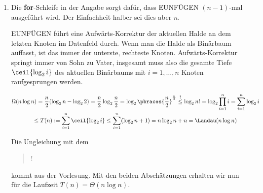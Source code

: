 \begin{solution}
\begin{enumerate}[label = \alph*]
\begin{center}

    \end{center}

    \item Die \textbf{for}-Schleife in der Angabe sorgt dafür, dass EUNFÜGEN $(n-1)$-mal ausgeführt wird.
    Der Einfachheit halber sei dies aber $n$.

    EUNFÜGEN führt eine Aufwärts-Korrektur der aktuellen Halde an dem letzten Knoten im Datenfeld durch.
    Wenn man die Halde als Binärbaum auffasst, ist das immer der unterste, rechteste Knoten.
    Aufwärts-Korrektur springt immer von Sohn zu Vater, insgesamt muss also die gesamte Tiefe $\ceil{\log_2 i}$ des aktuellen Binärbaums mit $i = 1, \dots, n$ Knoten raufgesprungen werden.

    \begin{multline*}
        \Omega(n \log n)
        =
        \frac{n}{2} (\log_2 n - \log_2 2)
        =
        \frac{n}{2} \log_2 \frac{n}{2}
        =
        \log_2 \pbraces{\frac{n}{2}}^\frac{n}{2}
        \stackrel{!}{\leq}
        \log_2 n!
        =
        \log_2 \prod_{i=1}^n i
        =
        \sum_{i=1}^n \log_2 i \\
        \leq
        T(n)
        :=
        \sum_{i=1}^n \ceil{\log_2 i}
        \leq
        \sum_{i=1}^n (\log_2 n + 1)
        =
        n \log_2 n + n
        =
        \Landau(n \log n)
    \end{multline*}

    Die Ungleichung mit dem \blockquote{!} kommt aus der Vorlesung.
    Mit den beiden Abschätzungen erhalten wir nun für die Laufzeit $T(n) = \Theta(n \log n)$.

\end{enumerate}

\end{solution}
